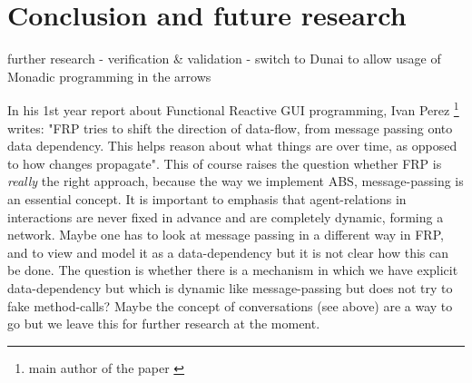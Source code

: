 \section{Conclusion and future research}

further research
	- verification \& validation
	- switch to Dunai to allow usage of Monadic programming in the arrows
	
	
In his 1st year report about Functional Reactive GUI programming, Ivan Perez \footnote{main author of the paper \cite{perez_functional_2016}} writes: "FRP tries to shift the direction of data-flow, from message passing onto data dependency. This helps reason about what things are over time, as opposed to how changes propagate". This of course raises the question whether FRP is \textit{really} the right approach, because the way we implement ABS, message-passing is an essential concept. It is important to emphasis that agent-relations in interactions are never fixed in advance and are completely dynamic, forming a network. Maybe one has to look at message passing in a different way in FRP, and to view and model it as a data-dependency but it is not clear how this can be done. The question is whether there is a mechanism in which we have explicit data-dependency but which is dynamic like message-passing but does not try to fake method-calls? Maybe the concept of conversations (see above) are a way to go but we leave this for further research at the moment.
